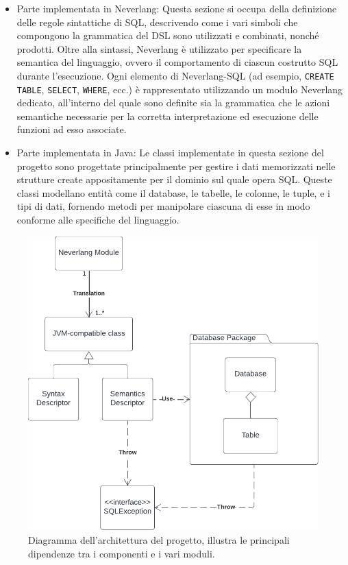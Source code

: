 \documentclass[12pt,a4paper,openright,twoside]{book}
\begin{document}
\begin{itemize}
\item Parte implementata in Neverlang: Questa sezione si occupa della definizione delle regole sintattiche di \ac{SQL}, descrivendo come 
i vari simboli che compongono la grammatica del \ac{DSL} sono utilizzati e combinati, nonché prodotti. Oltre alla sintassi, Neverlang è 
utilizzato per specificare la semantica del linguaggio, ovvero il comportamento di ciascun costrutto \ac{SQL} durante l’esecuzione. Ogni 
elemento di Neverlang-SQL (ad esempio, \texttt{CREATE TABLE}, \texttt{SELECT}, \texttt{WHERE}, ecc.) è rappresentato utilizzando un modulo Neverlang dedicato, 
all’interno del quale sono definite sia la grammatica che le azioni semantiche necessarie per la corretta interpretazione ed esecuzione 
delle funzioni ad esso associate.
\item Parte implementata in Java: Le classi implementate in questa sezione del progetto sono progettate principalmente per gestire i 
dati memorizzati nelle strutture create appositamente per il dominio sul quale opera \ac{SQL}. Queste classi modellano entità come il 
database, le tabelle, le colonne, le tuple, e i tipi di dati, fornendo metodi per manipolare ciascuna di esse in modo conforme alle 
specifiche del linguaggio.
\end{itemize}

\begin{figure}
\centering
\includegraphics[width=.8\linewidth]{figures/architecture.pdf}
\caption{Diagramma dell’architettura del progetto, illustra le principali dipendenze tra i componenti e i vari moduli.}
\label{fig:architecture}
\end{figure}
\end{document}
